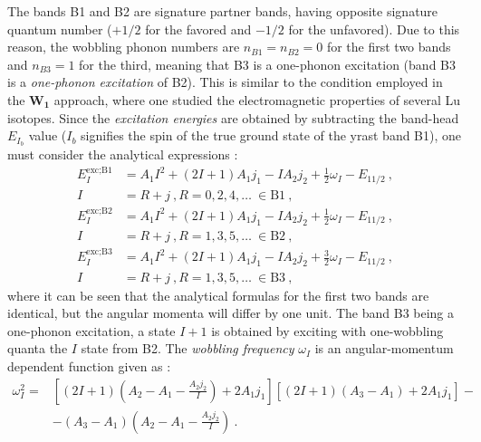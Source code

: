 The bands B1 and B2 are signature partner bands, having opposite signature quantum number ($+1/2$ for the favored and $-1/2$ for the unfavored). Due to this reason, the wobbling phonon numbers are $n_{B1}=n_{B2}=0$ for the first two bands and $n_{B3}=1$ for the third, meaning that B3 is a one-phonon excitation (band B3 is a \emph{one-phonon excitation} of B2). This is similar to the condition employed in the $\mathbf{W_1}$ approach, where one studied the electromagnetic properties of several Lu isotopes. Since the \emph{excitation energies} are obtained by subtracting the band-head $E_{I_b}$ value ($I_b$ signifies the spin of the true ground state of the yrast band B1), one must consider the analytical expressions \cite{raduta2020new}:
\begin{align}
    E_I^\text{exc;B1}&=A_1I^2+(2I+1)A_1j_1-IA_2j_2+\frac{1}{2}\omega_I-E_{11/2}\ ,\nonumber\\
    I&=R+j\ ,R=0,2,4,\dots\ \in\text{B1}\ ,\nonumber\\
    E_I^\text{exc;B2}&=A_1I^2+(2I+1)A_1j_1-IA_2j_2+\frac{1}{2}\omega_I-E_{11/2}\ ,\nonumber\\
    I&=R+j\ ,R=1,3,5,\dots\ \in\text{B2}\ ,\nonumber\\
    E_I^\text{exc;B3}&=A_1I^2+(2I+1)A_1j_1-IA_2j_2+\frac{3}{2}\omega_I-E_{11/2}\ ,\nonumber\\
    I&=R+j\ ,R=1,3,5,\dots\ \in\text{B3}\ ,
    \label{excitation-energies-new-boson}
\end{align}
where it can be seen that the analytical formulas for the first two bands are identical, but the angular momenta will differ by one unit. The band B3 being a one-phonon excitation, a state $I+1$ is obtained by exciting with one-wobbling quanta the $I$ state from B2. The \emph{wobbling frequency} $\omega_I$ is an angular-momentum dependent function given as \cite{raduta2020new}:
\begin{align}
    \omega_I^2=&\left[(2I+1)\left(A_2-A_1-\frac{A_2j_2}{I}\right)+2A_1j_1\right]\left[(2I+1)(A_3-A_1)+2A_1j_1\right]-\nonumber\\
    &-(A_3-A_1)\left(A_2-A_1-\frac{A_2j_2}{I}\right)\ .
    \label{wobbling-frequency-new-boson}
\end{align}

